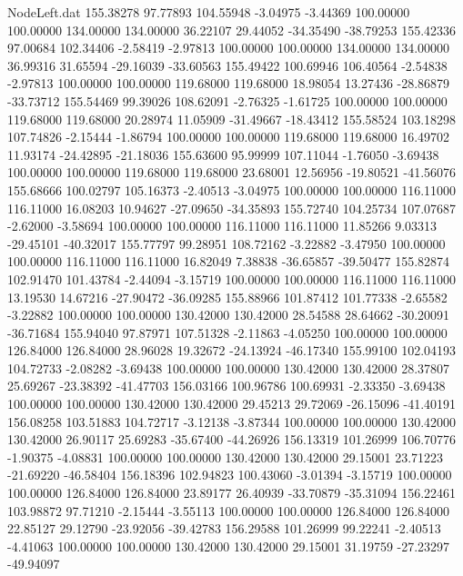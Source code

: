 \begin{filecontents}{NodeLeft.dat}
 155.38278   97.77893  104.55948    -3.04975   -3.44369  100.00000  100.00000  134.00000  134.00000   36.22107   29.44052  -34.35490  -38.79253
 155.42336   97.00684  102.34406    -2.58419   -2.97813  100.00000  100.00000  134.00000  134.00000   36.99316   31.65594  -29.16039  -33.60563
 155.49422  100.69946  106.40564    -2.54838   -2.97813  100.00000  100.00000  119.68000  119.68000   18.98054   13.27436  -28.86879  -33.73712
 155.54469   99.39026  108.62091    -2.76325   -1.61725  100.00000  100.00000  119.68000  119.68000   20.28974   11.05909  -31.49667  -18.43412
 155.58524  103.18298  107.74826    -2.15444   -1.86794  100.00000  100.00000  119.68000  119.68000   16.49702   11.93174  -24.42895  -21.18036
 155.63600   95.99999  107.11044    -1.76050   -3.69438  100.00000  100.00000  119.68000  119.68000   23.68001   12.56956  -19.80521  -41.56076
 155.68666  100.02797  105.16373    -2.40513   -3.04975  100.00000  100.00000  116.11000  116.11000   16.08203   10.94627  -27.09650  -34.35893
 155.72740  104.25734  107.07687    -2.62000   -3.58694  100.00000  100.00000  116.11000  116.11000   11.85266    9.03313  -29.45101  -40.32017
 155.77797   99.28951  108.72162    -3.22882   -3.47950  100.00000  100.00000  116.11000  116.11000   16.82049    7.38838  -36.65857  -39.50477
 155.82874  102.91470  101.43784    -2.44094   -3.15719  100.00000  100.00000  116.11000  116.11000   13.19530   14.67216  -27.90472  -36.09285
 155.88966  101.87412  101.77338    -2.65582   -3.22882  100.00000  100.00000  130.42000  130.42000   28.54588   28.64662  -30.20091  -36.71684
 155.94040   97.87971  107.51328    -2.11863   -4.05250  100.00000  100.00000  126.84000  126.84000   28.96028   19.32672  -24.13924  -46.17340
 155.99100  102.04193  104.72733    -2.08282   -3.69438  100.00000  100.00000  130.42000  130.42000   28.37807   25.69267  -23.38392  -41.47703
 156.03166  100.96786  100.69931    -2.33350   -3.69438  100.00000  100.00000  130.42000  130.42000   29.45213   29.72069  -26.15096  -41.40191
 156.08258  103.51883  104.72717    -3.12138   -3.87344  100.00000  100.00000  130.42000  130.42000   26.90117   25.69283  -35.67400  -44.26926
 156.13319  101.26999  106.70776    -1.90375   -4.08831  100.00000  100.00000  130.42000  130.42000   29.15001   23.71223  -21.69220  -46.58404
 156.18396  102.94823  100.43060    -3.01394   -3.15719  100.00000  100.00000  126.84000  126.84000   23.89177   26.40939  -33.70879  -35.31094
 156.22461  103.98872   97.71210    -2.15444   -3.55113  100.00000  100.00000  126.84000  126.84000   22.85127   29.12790  -23.92056  -39.42783
 156.29588  101.26999   99.22241    -2.40513   -4.41063  100.00000  100.00000  130.42000  130.42000   29.15001   31.19759  -27.23297  -49.94097

\end{filecontents}
